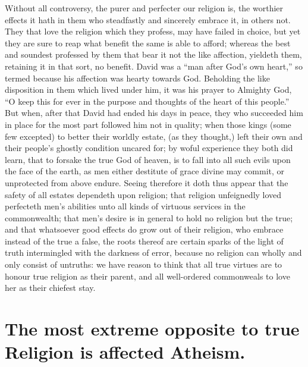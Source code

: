 Without all controversy, the purer and perfecter our religion is, the worthier effects it hath in them who steadfastly and sincerely embrace it, in others not. They that love the religion which they profess, may have failed in choice, but yet they are sure to reap what benefit the same is able to afford; whereas the best and soundest professed by them that bear it not the like affection, yieldeth them, retaining it in that sort, no benefit. David was a “man after God’s own heart,” so termed because his affection was hearty towards God. Beholding the like disposition in them which lived under him, it was his prayer to Almighty God, “O keep this for ever in the purpose and thoughts of the heart of this people.” But when, after that David had ended his days in peace, they who succeeded him in place for the most part followed him not in quality; when those kings (some few excepted) to better their worldly estate, (as they thought,) left their own and their people’s ghostly condition uncared for; by woful experience they both did learn, that to forsake the true God of heaven, is to fall into all such evils upon the face of the earth, as men either destitute of grace divine may commit, or unprotected from above endure.
Seeing therefore it doth thus appear that the safety of all estates dependeth upon religion; that religion unfeignedly loved perfecteth men’s abilities unto all kinds of virtuous services in the commonwealth; that men’s desire is in general to  hold no religion but the true; and that whatsoever good effects do grow out of their religion, who embrace instead of the true a false, the roots thereof are certain sparks of the light of truth intermingled with the darkness of error, because no religion can wholly and only consist of untruths: we have reason to think that all true virtues are to honour true religion as their parent, and all well-ordered commonweals to love her as their chiefest stay.

\section*{The most extreme opposite to true Religion is affected Atheism.}

